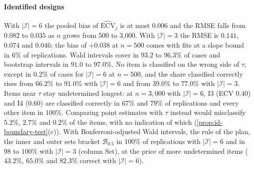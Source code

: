 \begin{table}[tbp]
\centering
\caption{X1, recovery of the boundary estimands (synthetic data; $R=100$ for $|\mathcal I|=6,3$, $50$ for $|\mathcal I|=2$, $40$ otherwise, where the MCSE of a coverage is about 7 points). Bias and RMSE of $\widehat{\mathrm{ECV}}_j$ are pooled over $j\in\mathcal I$. Cov.\ B and Cov.\ W: coverage (\%) of nominal 95\% percentile-bootstrap ($B=100$) and Wald intervals (logit scale, sandwich standard errors). Corr., Undet., Wrong: per-item classification (\%) as in, out or undetermined from the bootstrap interval, against the true $\mathcal B_{0.5}$. Set: probability (\%) that $\widehat{\mathcal B}{}^{\mathrm{in}}_{0.5}\subseteq\mathcal B_{0.5}\subseteq\widehat{\mathcal B}{}^{\mathrm{out}}_{0.5}$ with Bonferroni-adjusted Wald intervals (\cref{prop:id-boundary-test}(b)). $\hat\rho_{SI}$: correlated-factors estimate against its pseudo-true value; Cov.: sandwich interval. $^\dagger$Not identified (\cref{thm:ident}(b),(c)); the entries describe the optimiser, not the estimand.}
\label{tab:sim-main}
\footnotesize
\setlength{\tabcolsep}{4.2pt}

\end{table}

\paragraph{Identified designs}
With $|\mathcal I|=6$ the pooled bias of $\widehat{\mathrm{ECV}}_j$ is at most $0.006$ and the RMSE falls from $0.082$ to $0.035$ as $n$ grows from 500 to 3{,}000. With $|\mathcal I|=3$ the RMSE is $0.141$, $0.074$ and $0.046$; the bias of $+0.038$ at $n=500$ comes with fits at a slope bound in 6\% of replications. Wald intervals cover in $93.2$ to $96.3\%$ of cases and bootstrap intervals in $91.0$ to $97.0\%$. No item is classified on the wrong side of $\tau$, except in $0.2\%$ of cases for $|\mathcal I|=6$ at $n=500$, and the share classified correctly rises from $66.2\%$ to $91.0\%$ with $|\mathcal I|=6$ and from $39.0\%$ to $77.0\%$ with $|\mathcal I|=3$. Items near $\tau$ stay undetermined longest: at $n=3{,}000$ with $|\mathcal I|=6$, I3 (ECV $0.40$) and I4 ($0.60$) are classified correctly in $67\%$ and $79\%$ of replications and every other item in $100\%$. Comparing point estimates with $\tau$ instead would misclassify $5.2\%$, $2.7\%$ and $0.2\%$ of the items, with no indication of which (\cref{prop:id-boundary-test}(c)). With Bonferroni-adjusted Wald intervals, the rule of the plan, the inner and outer sets bracket $\mathcal B_{0.5}$ in $100\%$ of replications with $|\mathcal I|=6$ and in $98$ to $100\%$ with $|\mathcal I|=3$ (column Set), at the price of more undetermined items ($43.2\%$, $65.0\%$ and $82.3\%$ correct with $|\mathcal I|=6$).

